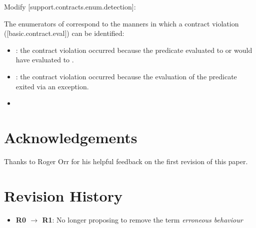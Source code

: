 Modify [support.contracts.enum.detection]:

\begin{adjustwidth}{0.5cm}{0.5cm}
The enumerators of  correspond to the manners in which a contract violation ([basic.contract.eval]) can be identified:
\begin{itemize}
\item {}: the contract violation occurred because the predicate evaluated to  or would have evaluated to .
\item {}: the contract violation occurred because the evaluation of the predicate exited via an exception.
\item {}
\end{itemize}
\end{adjustwidth}


\section*{Acknowledgements}
Thanks to Roger Orr for his helpful feedback on the first revision of this paper.


\section*{Revision History}
\begin{itemize}
\item \textbf{R0 $\rightarrow$ R1}: No longer proposing to remove the term \emph{erroneous behaviour}
\end{itemize}


\renewcommand{\addcontentsline}[3]{}%








